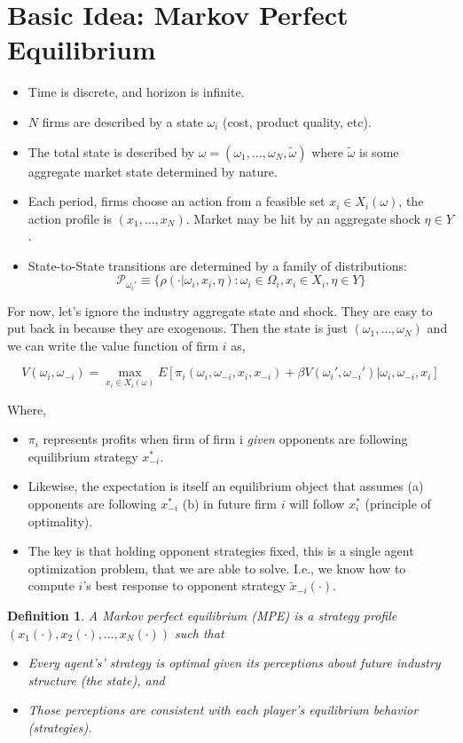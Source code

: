 \documentclass[twoside]{article}
\newtheorem{definition}[theorem]{Definition}
\begin{document}
\section{Basic Idea: Markov Perfect Equilibrium} 

\begin{itemize}
\item Time is discrete, and horizon is infinite. 
\item $N$ firms are described by a state $\omega_i$ (cost, product quality, etc). 
\item The total state is described by $\omega = (\omega_1, \ldots, \omega_N, \tilde{\omega})$
where $\tilde{\omega}$ is some aggregate market state determined by nature. 
\item Each period, firms choose an action from a feasible set $x_i \in X_i(\omega)$, the action profile is $(x_1, \ldots, x_N)$. 
Market may be hit by an aggregate shock $\eta \in Y$. 
\item State-to-State transitions are determined by a family of distributions: 
$$\mathcal{P}_{\omega_i'} \equiv \{ \rho(\cdot | \omega_i, x_i, \eta) : \omega_i \in \Omega_i, x_i \in X_i, \eta \in Y \} $$ 
\end{itemize}

For now, let's ignore the industry aggregate state and shock. They are easy to put back in because they are exogenous. Then the state 
is just $(\omega_1, \ldots, \omega_N)$ and we can write the value function of firm $i$ as, 

$$V(\omega_i, \omega_{-i}) = \max_{x_i \in X_i(\omega)}  E[  \pi_i(\omega_i, \omega_{-i}, x_i, x_{-i}) + \beta V(\omega_i', \omega_{-i}') | \omega_i, \omega_{-i}, x_i] $$

Where, 
\begin{itemize}
\item $\pi_i$ represents profits when firm of firm i \emph{given} opponents are following equilibrium strategy $x_{-i}^*$.
\item Likewise, the expectation is itself an equilibrium object that assumes (a) opponents are following $x_{-i}^*$ (b) in future firm $i$ will follow $x_i^*$ (principle of optimality). 
\item The key is that holding opponent strategies fixed, this is a single agent optimization problem, that we are able to solve. I.e., we know how to compute
$i$'s best response to opponent strategy $\tilde{x}_{-i}(\cdot)$. 
\end{itemize}
 
 \begin{definition} A Markov perfect equilibrium (MPE) is a strategy profile $(x_1(\cdot), x_2(\cdot), \ldots, x_N(\cdot))$ such that 
 \begin{itemize} 
 \item Every agent's' strategy is 
 optimal given its perceptions about future industry structure (the state), and 
 \item Those perceptions are consistent with each player's equilibrium behavior (strategies). 
 \end{itemize}
 \end{definition}
 
\end{document}
